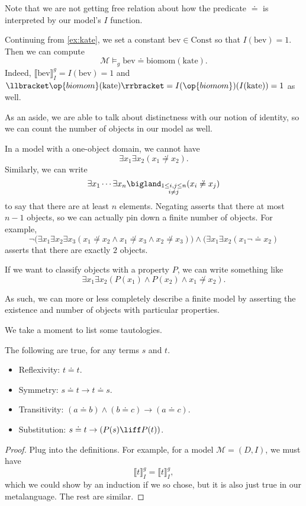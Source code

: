 Note that we are not getting free relation about how the predicate $\doteq $ is interpreted by our model's $I$ function.
\begin{example}
	Continuing from \autoref{ex:kate}, we set a constant $\mathrm{bev}\in\mathrm{Const}$ so that $I(\mathrm{bev})=1$. Then we can compute
	\[\mathcal M\models_g\mathrm{bev}\doteq\mathrm{biomom}(\mathrm{kate}).\]
	Indeed, $\llbracket\mathrm{bev}\rrbracket_I^g=I(\mathrm{bev})=1$ and $\llbracket\op{biomom}(\mathrm{kate})\rrbracket=I(\op{biomom})(I(\mathrm{kate}))=1$ as well.
\end{example}
As an aside, we are able to talk about distinctness with our notion of identity, so we can count the number of objects in our model as well.
\begin{ex}
	In a model with a one-object domain, we cannot have
	\[\exists x_1\exists x_2(x_1\not\doteq x_2).\]
	Similarly, we can write
	\[\exists x_1\cdots\exists x_n\bigland_{\substack{1\le i,j\le n\\i\ne j}}(x_i\not\doteq x_j)\]
	to say that there are at least $n$ elements. Negating asserts that there at most $n-1$ objects, so we can actually pin down a finite number of objects. For example,
	\[\lnot\big(\exists x_1\exists x_2\exists x_3(x_1\not\doteq x_2\land x_1\not\doteq x_3\land x_2\not\doteq x_3)\big)\land(\exists x_1\exists x_2(x_1\lnot\doteq x_2)\]
	asserts that there are exactly $2$ objects.
\end{ex}
\begin{example}
	If we want to classify objects with a property $P$, we can write something like
	\[\exists x_1\exists x_2(P(x_1)\land P(x_2)\land x_1\not\doteq x_2).\]
\end{example}
As such, we can more or less completely describe a finite model by asserting the existence and number of objects with particular properties.

We take a moment to list some tautologies.
\begin{proposition}
	The following are true, for any terms $s$ and $t$.
	\begin{itemize}
		\item Reflexivity: $t\doteq t$.
		\item Symmetry: $s\doteq t\to t\doteq s$.
		\item Transitivity: $(a\doteq b)\land (b\doteq c)\to(a\doteq c)$.
		\item Substitution: $s\doteq t\to(P(s)\liff P(t))$.
	\end{itemize}
\end{proposition}
\begin{proof}
	Plug into the definitions. For example, for a model $\mathcal M=(D,I)$, we must have
	\[\llbracket t\rrbracket_I^g=\llbracket t\rrbracket_I^g,\]
	which we could show by an induction if we so chose, but it is also just true in our metalanguage. The rest are similar.
\end{proof}

